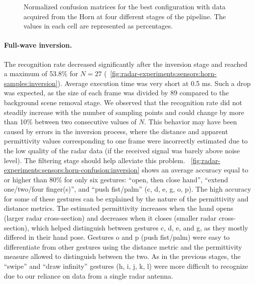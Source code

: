 \begin{figure}[tbp]
    \vspace{-6pt}
    \caption{Normalized confusion matrices for the best configuration with data acquired from the Horn at four different stages of the pipeline. The values in each cell are represented as percentages.}
    \label{fig:radar-experiments:sensors:horn-confusion}
\end{figure}

\paragraph{Full-wave inversion.}
The recognition rate decreased significantly after the inversion stage and reached a maximum of 53.8\% for $N{=}27$ (\fig~\ref{fig:radar-experiments:sensors:horn-samples:inversion}). Average execution time was very short at 0.5 ms. Such a drop was expected, as the size of each frame was divided by 89 compared to the background scene removal stage. 
%
We observed that the recognition rate did not steadily increase with the number of sampling points and could change by more than 10\% between two consecutive values of $N$. This behavior may have been caused by errors in the inversion process, where the distance and apparent permittivity values corresponding to one frame were incorrectly estimated due to the low quality of the radar data (\eg if the received signal was barely above noise level). The filtering stage should help alleviate this problem.
%
\fig~\ref{fig:radar-experiments:sensors:horn-confusion:inversion} shows an average accuracy equal to or higher than 80\% for only six gestures: ``open, then close hand'',  ``extend one/two/four finger(s)'', and ``push fist/palm'' (c, d, e, g, o, p). 
The high accuracy for some of these gestures can be explained by the nature of the permittivity and distance metrics. 
%
The estimated permittivity increases when the hand opens (larger radar cross-section) and decreases when it closes (smaller radar cross-section), which helped distinguish between gestures c, d, e, and g, as they mostly differed in their hand pose.
%
Gestures o and p (push fist/palm) were easy to differentiate from other gestures using the distance metric and the permittivity measure allowed to distinguish between the two.
%
As in the previous stages, the ``swipe'' and ``draw infinity'' gestures (h, i, j, k, l) were more difficult to recognize due to our reliance on data from a single radar antenna.

